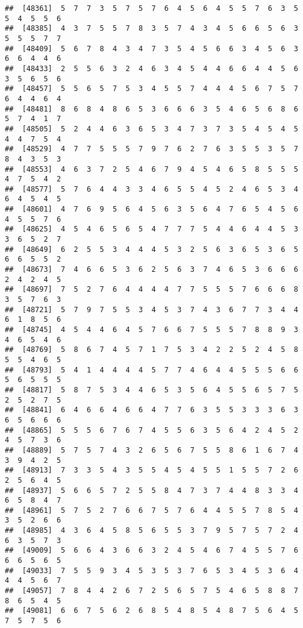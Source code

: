 \documentclass[
]{book}
\begin{document}
\begin{verbatim}
##  [48361]  5  7  7  3  5  7  5  7  6  4  5  6  4  5  5  7  6  3  5  5  4  5  5  6
##  [48385]  4  3  7  5  5  7  8  3  5  7  4  3  4  5  6  6  5  6  3  5  5  5  7  7
##  [48409]  5  6  7  8  4  3  4  7  3  5  4  5  6  6  3  4  5  6  3  6  6  4  4  6
##  [48433]  2  5  5  6  3  2  4  6  3  4  5  4  4  6  6  4  4  5  6  3  5  6  5  6
##  [48457]  5  5  6  5  7  5  3  4  5  5  7  4  4  4  5  6  7  5  7  6  4  4  6  4
##  [48481]  8  6  8  4  8  6  5  3  6  6  6  3  5  4  6  5  6  8  6  5  7  4  1  7
##  [48505]  5  2  4  4  6  3  6  5  3  4  7  3  7  3  5  4  5  4  5  4  4  7  5  4
##  [48529]  4  7  7  5  5  5  7  9  7  6  2  7  6  3  5  5  3  5  7  8  4  3  5  3
##  [48553]  4  6  3  7  2  5  4  6  7  9  4  5  4  6  5  8  5  5  5  4  7  5  4  2
##  [48577]  5  7  6  4  4  3  3  4  6  5  5  4  5  2  4  6  5  3  4  6  4  5  4  5
##  [48601]  4  7  6  9  5  6  4  5  6  3  5  6  4  7  6  5  4  5  6  4  5  5  7  6
##  [48625]  4  5  4  6  5  6  5  4  7  7  7  5  4  4  6  4  4  5  3  3  6  5  2  7
##  [48649]  6  2  5  5  3  4  4  4  5  3  2  5  6  3  6  5  3  6  5  6  6  5  5  2
##  [48673]  7  4  6  6  5  3  6  2  5  6  3  7  4  6  5  3  6  6  6  2  4  2  4  5
##  [48697]  7  5  2  7  6  4  4  4  4  7  7  5  5  5  7  6  6  6  8  3  5  7  6  3
##  [48721]  5  7  9  7  5  5  3  4  5  3  7  4  3  6  7  7  3  4  4  6  1  8  5  6
##  [48745]  4  5  4  4  6  4  5  7  6  6  7  5  5  5  7  8  8  9  3  4  6  5  4  6
##  [48769]  5  8  6  7  4  5  7  1  7  5  3  4  2  2  5  2  4  5  8  5  5  4  6  5
##  [48793]  5  4  1  4  4  4  4  5  7  7  4  6  4  4  5  5  5  6  6  5  6  5  5  5
##  [48817]  5  8  7  5  3  4  4  6  5  3  5  6  4  5  5  6  5  7  5  2  5  2  7  5
##  [48841]  6  4  6  6  4  6  6  4  7  7  6  3  5  5  3  3  3  6  3  6  5  6  6  6
##  [48865]  5  5  5  6  7  6  7  4  5  5  6  3  5  6  4  2  4  5  2  4  5  7  3  6
##  [48889]  5  7  5  7  4  3  2  6  5  6  7  5  5  8  6  1  6  7  4  3  9  4  2  5
##  [48913]  7  3  3  5  4  3  5  5  4  5  4  5  5  1  5  5  7  2  6  2  5  6  4  5
##  [48937]  5  6  6  5  7  2  5  5  8  4  7  3  7  4  4  8  3  3  4  6  5  8  4  7
##  [48961]  5  7  5  2  7  6  6  7  5  7  6  4  4  5  5  7  8  5  4  3  5  2  6  6
##  [48985]  4  3  6  4  5  8  5  6  5  5  3  7  9  5  7  5  7  2  4  6  3  5  7  3
##  [49009]  5  6  6  4  3  6  6  3  2  4  5  4  6  7  4  5  5  7  6  6  6  5  6  5
##  [49033]  7  5  5  9  3  4  5  3  5  3  7  6  5  3  4  5  3  6  4  4  4  5  6  7
##  [49057]  7  8  4  4  2  6  7  2  5  6  5  7  5  4  6  5  8  8  7  8  6  5  4  5
##  [49081]  6  6  7  5  6  2  6  8  5  4  8  5  4  8  7  5  6  4  5  7  5  7  5  6

\end{verbatim}
\end{document}

